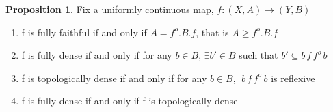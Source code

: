\documentclass[18pt,a4paper]{article}
\theoremstyle{definition}
\newtheorem{proop}[theorem]{Proposition}
\begin{document}
		\begin{proop}
			Fix a uniformly continuous map, $f:(X,A) \rightarrow (Y,B)$
			\begin{enumerate}[label=(\alph*)]
				\item f is fully faithful if and only if $A= f^o.B.f$, that is
					$A\geq f^o.B.f$
				\item f is fully dense if and only if for any $b\in B$, $\exists b' \in B$
					such that $b' \subseteq b\,f\,f^o \,b$
				\item f is topologically dense if and only if for any $b\in B$,
					$\; b \, f\, f^o\,b$ is reflexive
				\item f is fully dense if and only if f is topologically dense
			\end{enumerate}
		\end{proop}
\end{document}
